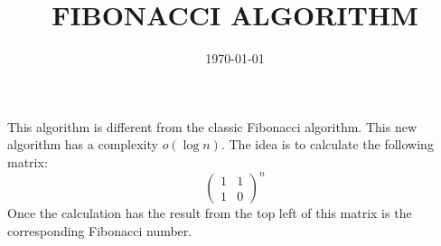 \documentclass[12pt, a4paper]{article}
\title{FIBONACCI ALGORITHM}
\date{\today}
\author{}
\begin{document}
\maketitle

This algorithm is different from the classic Fibonacci algorithm. This new algorithm has a complexity $o(\log n)$. The idea is to calculate the following matrix: 
$$\left(\begin{array}{cc}1 & 1 \\ 1 & 0\end{array}\right)^{n}$$ Once the calculation has the result from the top left of this matrix is the corresponding Fibonacci number.
\end{document}
